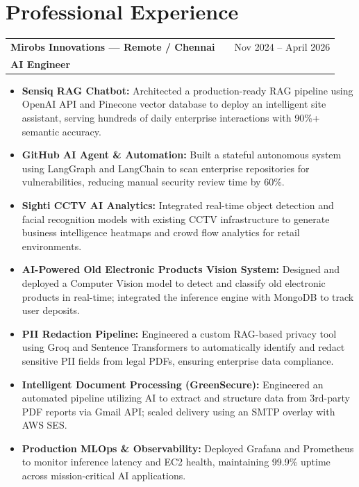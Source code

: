 \documentclass[a4paper,10pt]{article}
\begin{document}
\section{Professional Experience}
\begin{tabularx}{\linewidth}{ @{}l X r@{} }
\textbf{Mirobs Innovations — Remote / Chennai} & & \hfill \color[HTML]{371e77} Nov 2024 -- April 2026 \\
\color[HTML]{371e77}\textbf{AI Engineer} & & \\
\end{tabularx}
\begin{itemize}[nosep, leftmargin=2em]
\item \textbf{Sensiq RAG Chatbot:} Architected a production-ready RAG pipeline using OpenAI API and Pinecone vector database to deploy an intelligent site assistant, serving hundreds of daily enterprise interactions with 90\%+ semantic accuracy.
\item \textbf{GitHub AI Agent \& Automation:} Built a stateful autonomous system using LangGraph and LangChain to scan enterprise repositories for vulnerabilities, reducing manual security review time by 60\%.
\item \textbf{Sighti CCTV AI Analytics:} Integrated real-time object detection and facial recognition models with existing CCTV infrastructure to generate business intelligence heatmaps and crowd flow analytics for retail environments.
\item \textbf{AI-Powered Old Electronic Products Vision System:} Designed and deployed a Computer Vision model to detect and classify old electronic products in real-time; integrated the inference engine with MongoDB to track user deposits.
\item \textbf{PII Redaction Pipeline:} Engineered a custom RAG-based privacy tool using Groq and Sentence Transformers to automatically identify and redact sensitive PII fields from legal PDFs, ensuring enterprise data compliance.
\item \textbf{Intelligent Document Processing (GreenSecure):} Engineered an automated pipeline utilizing AI to extract and structure data from 3rd-party PDF reports via Gmail API; scaled delivery using an SMTP overlay with AWS SES.
\item \textbf{Production MLOps \& Observability:} Deployed Grafana and Prometheus to monitor inference latency and EC2 health, maintaining 99.9\% uptime across mission-critical AI applications.
\end{itemize}
\end{document}
